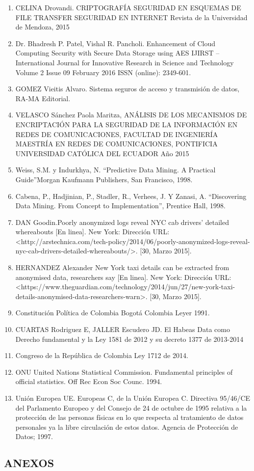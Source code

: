 \documentclass[a4paper,openright,12pt]{book}
\theoremstyle{definition}
\theoremstyle{remark}
\begin{document}
\begin{enumerate}
    \item CELINA Drovandi. CRIPTOGRAFÍA
SEGURIDAD EN ESQUEMAS DE FILE TRANSFER SEGURIDAD EN INTERNET Revista de la Universidad de Mendoza, 2015
    \item Dr. Bhadresh P. Patel, Vishal R. Pancholi. Enhancement of Cloud Computing Security with Secure Data Storage using AES IJIRST –International Journal for Innovative Research in Science and Technology Volume 2 Issue 09 February 2016 ISSN (online): 2349-601.
    \item GOMEZ Vieitis Alvaro. Sistema seguros de acceso y transmisión de datos, RA-MA Editorial.
    \item VELASCO Sánchez Paola Maritza, ANÁLISIS DE LOS MECANISMOS DE ENCRIPTACIÓN PARA LA SEGURIDAD DE LA INFORMACIÓN EN REDES DE COMUNICACIONES, FACULTAD DE INGENIERÍA MAESTRÍA EN REDES DE COMUNICACIONES, PONTIFICIA UNIVERSIDAD CATÓLICA DEL ECUADOR Año 2015
    \item Weiss, S.M. y Indurkhya, N. “Predictive Data Mining. A Practical Guide”Morgan Kaufmann Publishers, San Francisco, 1998.
    \item Cabena, P., Hadjinian, P., Stadler, R., Verhees, J. Y Zanasi, A. “Discovering Data Mining. From Concept to Implementation”, Prentice Hall, 1998.
    \item DAN Goodin.Poorly anonymized logs reveal NYC cab drivers’ detailed whereabouts [En linea]. New York: Dirección URL: <http://arstechnica.com/tech-policy/2014/06/poorly-anonymized-logs-reveal-nyc-cab-drivers-detailed-whereabouts/>. [30, Marzo 2015].
    \item HERNANDEZ Alexander New York taxi details can be extracted from anonymised data, researchers say [En linea]. New York: Dirección URL: <https://www.theguardian.com/technology/2014/jun/27/new-york-taxi-details-anonymised-data-researchers-warn>. [30, Marzo 2015].
    \item Constitución Política de Colombia Bogotá Colombia Leyer 1991.
    \item CUARTAS Rodriguez E, JALLER Escudero JD. El Habeas Data como Derecho fundamental y la Ley 1581 de 2012 y su decreto 1377 de 2013-2014
    \item Congreso de la República de Colombia Ley 1712 de 2014.
    \item ONU United Nations Statistical Commission. Fundamental principles of official statistics. Off Rec Econ Soc Counc. 1994.
    \item Unión Europea UE. Europeas C, de la Unión Europea C. Directiva 95/46/CE del Parlamento Europeo y del Consejo de 24 de octubre de 1995 relativa a la protección de las personas físicas en lo que respecta al tratamiento de datos personales ya la libre circulación de estos datos. Agencia de Protección de Datos; 1997.
\end{enumerate}


\begin{center}
 \chapter{ANEXOS}\label{cap.anexos}
\end{center}
\end{document}
